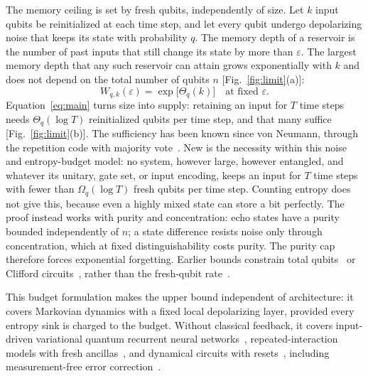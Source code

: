 \documentclass[aps,prl,twocolumn,superscriptaddress,floatfix]{revtex4-2}
\theoremstyle{plain}
\begin{document}
The memory ceiling is set by fresh qubits, independently of size. Let $k$ input qubits be reinitialized at each time step, and let every qubit undergo depolarizing noise that keeps its state with probability $q$. The memory depth of a reservoir is the number of past inputs that still change its state by more than $\varepsilon$. The largest memory depth that any such reservoir can attain grows exponentially with $k$ and does not depend on the total number of qubits $n$ [Fig.~\ref{fig:limit}(a)]:
\begin{equation}
W_{q,k}(\varepsilon)=\exp\!\big[\Theta_q(k)\big]\quad\text{at fixed }\varepsilon.
\label{eq:main}
\end{equation}
Equation~\eqref{eq:main} turns size into supply: retaining an input for $T$ time steps needs $\Theta_q(\log T)$ reinitialized qubits per time step, and that many suffice [Fig.~\ref{fig:limit}(b)]. The sufficiency has been known since von Neumann, through the repetition code with majority vote~\cite{vonNeumann1956}. New is the necessity within this noise and entropy-budget model: no system, however large, however entangled, and whatever its unitary, gate set, or input encoding, keeps an input for $T$ time steps with fewer than $\Omega_q(\log T)$ fresh qubits per time step. Counting entropy does not give this, because even a highly mixed state can store a bit perfectly. The proof instead works with purity and concentration: echo states have a purity bounded independently of $n$; a state difference resists noise only through concentration, which at fixed distinguishability costs purity. The purity cap therefore forces exponential forgetting. Earlier bounds constrain total qubits~\cite{Fawzi2022} or Clifford circuits~\cite{Nelson2026}, rather than the fresh-qubit rate~\cite[Sec.~VIII\,B]{SM}.

This budget formulation makes the upper bound independent of architecture: it covers Markovian dynamics with a fixed local depolarizing layer, provided every entropy sink is charged to the budget. Without classical feedback, it covers input-driven variational quantum recurrent neural networks~\cite{Takaki2021}, repeated-interaction models with fresh ancillas~\cite{Cattaneo2021}, and dynamical circuits with resets~\cite{Yasuda2023,Hu2024}, including measurement-free error correction~\cite{Heussen2024}.
\end{document}
